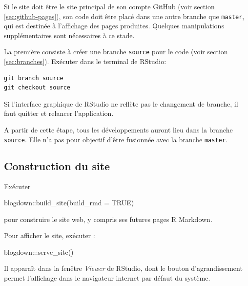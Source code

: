 \documentclass[
  11pt,
  french,
  a4paper,
  extrafontsizes,onecolumn,openright
  ]{memoir}
\newenvironment{Shaded}{\begin{snugshade}}{\end{snugshade}}
\newcommand{\AttributeTok}[1]{\textcolor[rgb]{0.77,0.63,0.00}{#1}}
\newcommand{\ConstantTok}[1]{\textcolor[rgb]{0.00,0.00,0.00}{#1}}
\newcommand{\FunctionTok}[1]{\textcolor[rgb]{0.00,0.00,0.00}{#1}}
\newcommand{\NormalTok}[1]{#1}
\newcommand{\SpecialCharTok}[1]{\textcolor[rgb]{0.00,0.00,0.00}{#1}}
\begin{document}
Si le site doit être le site principal de son compte GitHub (voir section \ref{sec:github-pages}), son code doit être placé dans une autre branche que \texttt{master}, qui est destinée à l'affichage des pages produites.
Quelques manipulations supplémentaires sont nécessaires à ce stade.

La première consiste à créer une branche \texttt{source} pour le code (voir section \ref{sec:branches}).
Exécuter dans le terminal de RStudio:

\begin{verbatim}
git branch source
git checkout source
\end{verbatim}

Si l'interface graphique de RStudio ne reflète pas le changement de branche, il faut quitter et relancer l'application.

A partir de cette étape, tous les développements auront lieu dans la branche \texttt{source}.
Elle n'a pas pour objectif d'être fusionnée avec la branche \texttt{master}.

\hypertarget{construction-du-site}{%
\subsection{Construction du site}\label{construction-du-site}}

Exécuter

\scriptsize

\begin{Shaded}
\begin{Highlighting}[]
\NormalTok{blogdown}\SpecialCharTok{::}\FunctionTok{build\_site}\NormalTok{(}\AttributeTok{build\_rmd =} \ConstantTok{TRUE}\NormalTok{)}
\end{Highlighting}
\end{Shaded}

\normalsize

pour construire le site web, y compris ses futures pages R Markdown.

Pour afficher le site, exécuter :

\scriptsize

\begin{Shaded}
\begin{Highlighting}[]
\NormalTok{blogdown}\SpecialCharTok{:::}\FunctionTok{serve\_site}\NormalTok{()}
\end{Highlighting}
\end{Shaded}

\normalsize

Il apparaît dans la fenêtre \emph{Viewer} de RStudio, dont le bouton d'agrandissement permet l'affichage dans le navigateur internet par défaut du système.
\end{document}
